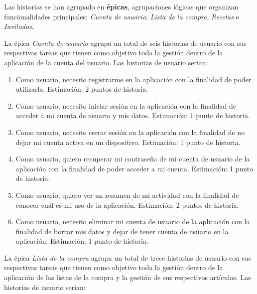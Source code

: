 Las historias se han agrupado en \textbf{\'epicas}, agrupaciones l\'ogicas que organizan funcionalidades principales: \textit{Cuenta de usuario}, \textit{Lista de la compra}, \textit{Recetas} e \textit{Invitados}.


La épica \textit{Cuenta de usuario} agrupa un total de seis historias de usuario con sus respectivas tareas que tienen como objetivo toda la gestión dentro de la aplicación de la cuenta del usuario. Las historias de usuario serian:

\begin{enumerate}
  \item Como usuario, necesito registrarme en la aplicación con la finalidad de poder utilizarla. Estimación: 2 puntos de historia.
  \item Como usuario, necesito iniciar sesión en la aplicación con la finalidad de acceder a mi cuenta de usuario y mis datos. Estimación: 1 punto de historia.
  \item Como usuario, necesito cerrar sesión en la aplicación con la finalidad de no dejar mi cuenta activa en un dispositivo. Estimación: 1 punto de historia.
  \item Como usuario, quiero recuperar mi contraseña de mi cuenta de usuario de la aplicación con la finalidad de poder acceder a mi cuenta. Estimación: 1 punto de historia.
  \item Como usuario, quiero ver un resumen de mi actividad con la finalidad de conocer cuál es mi uso de la aplicación. Estimación: 2 puntos de historia.
  \item Como usuario, necesito eliminar mi cuenta de usuario de la aplicación con la finalidad de borrar mis datos y dejar de tener cuenta de usuario en la aplicación. Estimación: 1 punto de historia.
\end{enumerate}

La épica \textit{Lista de la compra} agrupa un total de trece historias de usuario con sus respectivas tareas que tienen como objetivo toda la gestión dentro de la aplicación de las listas de la compra y la gestión de sus respectivos artículos. Las historias de usuario serian:

